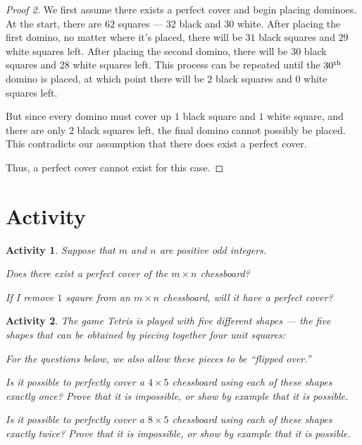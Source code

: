 \documentclass{article}
\theoremstyle{definition}
\theoremstyle{plain}
\theoremstyle{activity}
\newtheorem{activity}{Activity}
\begin{document}
\begin{proof}[Proof 2]
    We first assume there exists a perfect cover and begin placing dominoes. At the start, there are $62$ squares --- $32$ black and $30$ white. After placing the first domino, no matter where it's placed, there will be $31$ black squares and $29$ white squares left. After placing the second domino, there will be $30$ black squares and $28$ white squares left. This process can be repeated until the $30\textsuperscript{th}$ domino is placed, at which point there will be $2$ black squares and $0$ white squares left.

    But since every domino must cover up $1$ black square and $1$ white square, and there are only $2$ black squares left, the final domino cannot possibly be placed. This contradicts our assumption that there does exist a perfect cover.

    Thus, a perfect cover cannot exist for this case.
\end{proof}

\section{Activity}

\begin{activity}
    Suppose that $m$ and $n$ are positive odd integers.
    \begin{parts}
        \item Does there exist a perfect cover of the $m \times n$ chessboard?
        \item If I remove $1$ sqaure from an $m \times n$ chessboard, will it have a perfect cover?
    \end{parts}
\end{activity}

\begin{activity}
    The game \emph{Tetris} is played with five different shapes --- the five shapes that can be obtained by piecing together four unit squares:

    For the questions below, we also allow these pieces to be ``flipped over.''
    \begin{parts}
        \item Is it possible to perfectly cover a $4 \times 5$ chessboard using each of these shapes exactly once? Prove that it is impossible, or show by example that it is possible.
        \item Is it possible to perfectly cover a $8 \times 5$ chessboard using each of these shapes exactly twice? Prove that it is impossible, or show by example that it is possible.
    \end{parts}
\end{activity}
\end{document}
